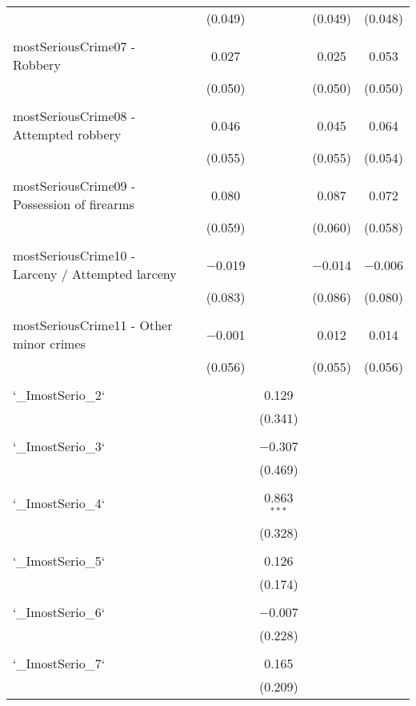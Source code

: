 \documentclass{article}
\begin{document}
\begin{table}[!htbp]
{\begin{tabular}{@{\extracolsep{5pt}}lccccc}
  &  & (0.049) &  & (0.049) & (0.048) \\ 
  & & & & & \\ 
 mostSeriousCrime07 - Robbery &  & 0.027 &  & 0.025 & 0.053 \\ 
  &  & (0.050) &  & (0.050) & (0.050) \\ 
  & & & & & \\ 
 mostSeriousCrime08 - Attempted robbery &  & 0.046 &  & 0.045 & 0.064 \\ 
  &  & (0.055) &  & (0.055) & (0.054) \\ 
  & & & & & \\ 
 mostSeriousCrime09 - Possession of firearms &  & 0.080 &  & 0.087 & 0.072 \\ 
  &  & (0.059) &  & (0.060) & (0.058) \\ 
  & & & & & \\ 
 mostSeriousCrime10 - Larceny / Attempted larceny &  & $-$0.019 &  & $-$0.014 & $-$0.006 \\ 
  &  & (0.083) &  & (0.086) & (0.080) \\ 
  & & & & & \\ 
 mostSeriousCrime11 - Other minor crimes &  & $-$0.001 &  & 0.012 & 0.014 \\ 
  &  & (0.056) &  & (0.055) & (0.056) \\ 
  & & & & & \\ 
 `\_ImostSerio\_2` &  &  & 0.129 &  &  \\ 
  &  &  & (0.341) &  &  \\ 
  & & & & & \\ 
 `\_ImostSerio\_3` &  &  & $-$0.307 &  &  \\ 
  &  &  & (0.469) &  &  \\ 
  & & & & & \\ 
 `\_ImostSerio\_4` &  &  & 0.863$^{***}$ &  &  \\ 
  &  &  & (0.328) &  &  \\ 
  & & & & & \\ 
 `\_ImostSerio\_5` &  &  & 0.126 &  &  \\ 
  &  &  & (0.174) &  &  \\ 
  & & & & & \\ 
 `\_ImostSerio\_6` &  &  & $-$0.007 &  &  \\ 
  &  &  & (0.228) &  &  \\ 
  & & & & & \\ 
 `\_ImostSerio\_7` &  &  & 0.165 &  &  \\ 
  &  &  & (0.209) &  &  \\ 

\end{tabular}}
\end{table}
\end{document}
